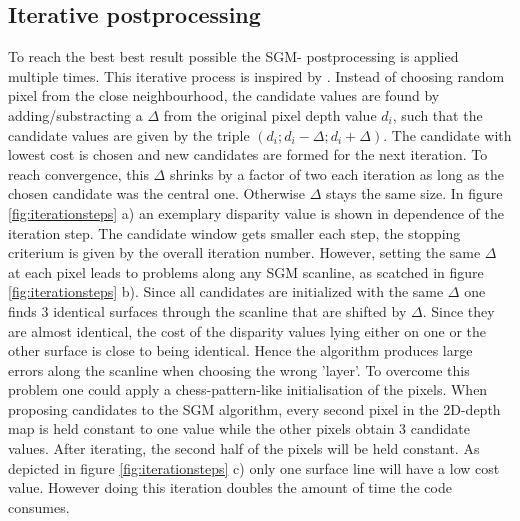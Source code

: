 \documentclass  [
  paper    = a4,
  BCOR     = 10mm,
  twoside,
  fontsize = 12pt,
  fleqn,
  toc      = bibnumbered,
  toc      = listofnumbered,
  numbers  = noendperiod,
  headings = normal,
  listof   = leveldown,
  version  = 3.03
]                                       {scrreprt}
\begin{document}
\subsection{Iterative postprocessing}
To reach the best best result possible the SGM- postprocessing is applied multiple times. This iterative process is inspired by \cite{Benjaminsarbeit}. Instead of choosing random pixel from the close neighbourhood, the candidate values are found by adding/substracting a $\Delta$ from the original pixel depth value $d_{i}$, such that the candidate values are given by the triple $(d_{i};d_{i}-\Delta;d_{i}+\Delta)$. The candidate with lowest cost is chosen and new candidates are formed for the next iteration. To reach convergence, this $\Delta$ shrinks by a factor of two each iteration as long as the chosen candidate was the central one. Otherwise $\Delta$ stays the same size. In figure \ref{fig:iterationsteps} a) an exemplary disparity value is shown in dependence of the iteration step. The candidate window gets smaller each step, the stopping criterium is given by the overall iteration number. 
However, setting the same $\Delta$ at each pixel leads to problems along any SGM scanline, as scatched in figure \ref{fig:iterationsteps} b). Since all candidates are initialized with the same $\Delta$ one finds 3 identical surfaces through the scanline that are shifted by $\Delta$. Since they are almost identical, the cost of the disparity values lying either on one or the other surface is close to being identical. Hence the algorithm produces large errors along the scanline when choosing the wrong 'layer'. To overcome this problem one could apply a chess-pattern-like initialisation of the pixels. When proposing candidates to the SGM algorithm, every second pixel in the 2D-depth map is held constant to one value while the other pixels obtain 3 candidate values. After iterating, the second half of the pixels will be held constant. As depicted in figure \ref{fig:iterationsteps} c) only one surface line will have a low cost value. However doing this iteration doubles the amount of time the code consumes. 
\end{document}
